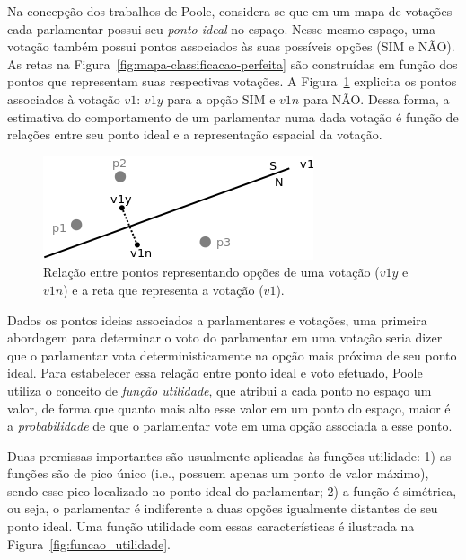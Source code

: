 \documentclass[
	article,			%
	12pt,				%
    twoside,			%
	a4paper,			%
	english,			%
	french,				%
	spanish,			%
	brazil,				%
	]{abntex2}
\newcommand\nay{NÃO\xspace}
\newcommand\yea{SIM\xspace}
\begin{document}
Na concepção dos trabalhos de Poole, considera-se que em um mapa de votações cada parlamentar possui seu \emph{ponto ideal} no espaço. Nesse mesmo espaço, uma votação também possui pontos associados às suas possíveis opções (\yea e \nay). As retas na Figura~\ref{fig:mapa-classificacao-perfeita} são construídas em função dos pontos que representam suas respectivas votações. A Figura~\ref{fig:pontos-votacoes} explicita os pontos associados à votação $v1$: $v1y$ para a opção \yea e $v1n$ para \nay. Dessa forma, a estimativa do comportamento de um parlamentar numa dada votação é função de relações entre seu ponto ideal e a representação espacial da votação. 

\begin{figure}[h]
  \centering
  \includegraphics[scale=0.6]{figs/pontos-votacoes.png}
  \caption{Relação entre pontos representando opções de uma votação ($v1y$ e $v1n$) e a reta que representa a votação ($v1$).}
  \label{fig:pontos-votacoes}
\end{figure}

Dados os pontos ideias associados a parlamentares e votações, uma primeira abordagem para determinar o voto do parlamentar em uma votação seria dizer que o parlamentar vota deterministicamente na opção mais próxima de seu ponto ideal. Para estabelecer essa relação entre ponto ideal e voto efetuado,  Poole utiliza o conceito de \emph{função utilidade}, que atribui a cada ponto no espaço um valor, de forma que quanto mais alto esse valor em um ponto do espaço, maior é a \emph{probabilidade} de que o parlamentar vote em uma opção associada a esse ponto.

Duas premissas importantes são usualmente aplicadas às funções utilidade: 1) as funções são de pico único (i.e., possuem apenas um ponto de valor máximo), sendo esse pico localizado no ponto ideal do parlamentar; 2) a função é simétrica, ou seja, o parlamentar é indiferente a duas opções igualmente distantes de seu ponto ideal. Uma função utilidade com essas características é ilustrada na Figura~\ref{fig:funcao_utilidade}.
\end{document}

